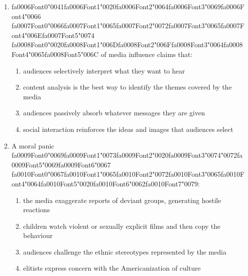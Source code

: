 \documentclass[12pt]{article}
\begin{document}
\begin{enumerate}[label=\arabic*.]
\begin{enumerate}[label=(\alph*)]
\end{enumerate}
\item {\csname fa0006Font0\endcsname\char"0041}{\csname fa0006Font1\endcsname\char"0020}{\csname fa0006Font2\endcsname\char"0064}{\csname fa0006Font3\endcsname\char"0069}{\csname fa0006Font4\endcsname\char"0066} {\csname fa0007Font0\endcsname\char"0066}{\csname fa0007Font1\endcsname\char"0065}{\csname fa0007Font2\endcsname\char"0072}{\csname fa0007Font3\endcsname\char"0065}{\csname fa0007Font4\endcsname\char"006E}{\csname fa0007Font5\endcsname\char"0074} {\csname fa0008Font0\endcsname\char"0020}{\csname fa0008Font1\endcsname\char"006D}{\csname fa0008Font2\endcsname\char"006F}{\csname fa0008Font3\endcsname\char"0064}{\csname fa0008Font4\endcsname\char"0065}{\csname fa0008Font5\endcsname\char"006C} of media influence claims that:
\begin{enumerate}[label=(\alph*)]
    \item audiences selectively interpret what they want to hear
    \item content analysis is the best way to identify the themes covered by the media
    \item audiences passively absorb whatever messages they are given
    \item social interaction reinforces the ideas and images that audiences select
\end{enumerate}
\item A moral panic {\csname fa0009Font0\endcsname\char"0069}{\csname fa0009Font1\endcsname\char"0073}{\csname fa0009Font2\endcsname\char"0020}{\csname fa0009Font3\endcsname\char"0074}{\char"0072}{\csname fa0009Font5\endcsname\char"0069}{\csname fa0009Font6\endcsname\char"0067} {\csname fa0010Font0\endcsname\char"0067}{\csname fa0010Font1\endcsname\char"0065}{\csname fa0010Font2\endcsname\char"0072}{\csname fa0010Font3\endcsname\char"0065}{\csname fa0010Font4\endcsname\char"0064}{\csname fa0010Font5\endcsname\char"0020}{\csname fa0010Font6\endcsname\char"0062}{\csname fa0010Font7\endcsname\char"0079}:
\begin{enumerate}[label=(\alph*)]
    \item the media exaggerate reports of deviant groups, generating hostile reactions
    \item children watch violent or sexually explicit films and then copy the behaviour
    \item audiences challenge the ethnic stereotypes represented by the media
    \item elitists express concern with the Americanization of culture

\end{enumerate}
\end{enumerate}
\end{document}
